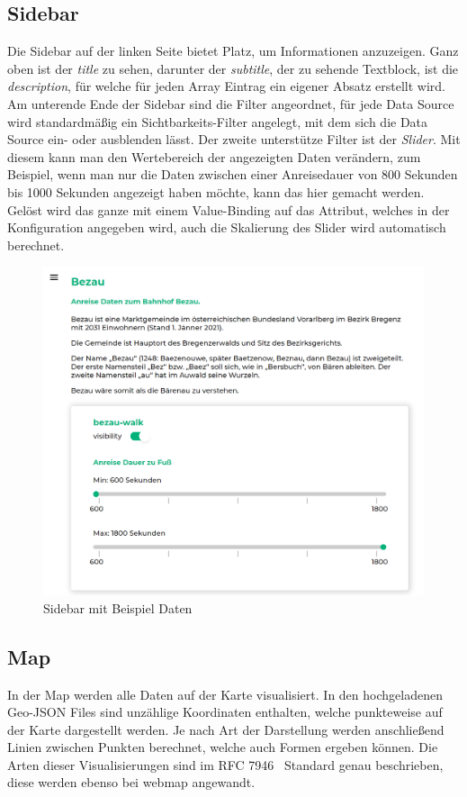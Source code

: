 \subsection{Sidebar}
Die Sidebar auf der linken Seite bietet Platz, um Informationen anzuzeigen.
Ganz oben ist der \emph{title} zu sehen, darunter der \emph{subtitle}, der zu sehende Textblock, ist die \emph{description},
für welche für jeden Array Eintrag ein eigener Absatz erstellt wird.
Am unterende Ende der Sidebar sind die Filter angeordnet, für jede Data Source wird standardmäßig ein Sichtbarkeits-Filter angelegt,
mit dem sich die Data Source ein- oder ausblenden lässt.
Der zweite unterstütze Filter ist der \emph{Slider}.
Mit diesem kann man den Wertebereich der angezeigten Daten verändern, zum Beispiel, wenn man nur die Daten zwischen
einer Anreisedauer von 800 Sekunden bis 1000 Sekunden angezeigt haben möchte, kann das hier gemacht werden.
Gelöst wird das ganze mit einem Value-Binding auf das Attribut, welches in der Konfiguration angegeben wird, auch
die Skalierung des Slider wird automatisch berechnet.

\begin{figure}[hbt!]
    \centering
    \includegraphics[scale=.7]{pics/sidebar}
    \caption{Sidebar mit Beispiel Daten}
    \label{fig:sidebar}
\end{figure}

\subsection{Map}
In der Map werden alle Daten auf der Karte visualisiert.
In den hochgeladenen Geo-JSON Files sind unzählige Koordinaten enthalten, welche punkteweise auf der Karte dargestellt werden.
Je nach Art der Darstellung werden anschließend Linien zwischen Punkten berechnet, welche auch Formen ergeben können.
Die Arten dieser Visualisierungen sind im RFC 7946~\cite{rfc7946} Standard genau beschrieben, diese werden ebenso bei webmap angewandt.


